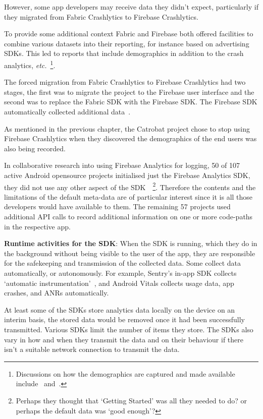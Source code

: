 However, some app developers may receive data they didn't expect, particularly if they migrated from Fabric Crashlytics to Firebase Crashlytics. 

To provide some additional context Fabric and Firebase both offered facilities to combine various datasets into their reporting, for instance based on advertising SDKs. This led to reports that include demographics in addition to the crash analytics, \emph{etc.}~\footnote{Discussions on how the demographics are captured and made available include~\citep{joe2016_firebase_analytics_demographics} and~\citep{chelo2020_firebase_does_not_collect_age_or_gender_data}.}. 

The forced migration from Fabric Crashlytics to Firebase Crashlytics had two stages, the first was to migrate the project to the Firebase user interface and the second was to replace the Fabric SDK with the Firebase SDK. The Firebase SDK automatically collected additional data~\citep{firebase_help_GA4_2021_predefined_user_dimensions}.

As mentioned in the previous chapter, the Catrobat project chose to stop using Firebase Crashlytics when they discovered the demographics of the end users was also being recorded. 
%

In collaborative research into using Firebase Analytics for logging, 50 of 107 active Android opensource projects initialised just the Firebase Analytics SDK, they did not use any other aspect of the SDK~\citep{harty2021_logging_practices_with_mobile_analytics}~\footnote{Perhaps they thought that `Getting Started' was all they needed to do? or perhaps the default data was `good enough'?}. Therefore the contents and the limitations of the default meta-data are of particular interest since it is all those developers would have available to them. The remaining 57 projects used additional API calls to record additional information on one or more code-paths in the respective app.

\textbf{Runtime activities for the SDK}: 
When the SDK is running, which they do in the background without being visible to the user of the app, they are responsible for the safekeeping and transmission of the collected data. Some collect data automatically, or autonomously. For example, Sentry's in-app SDK collects `automatic instrumentation'~\citep{sentry2021_mobile_vitals_four_metrics_every_mobile_developer_should_care_about}, and Android Vitals collects usage data, app crashes, and ANRs automatically.

At least some of the SDKs store analytics data locally on the device on an interim basis, the stored data would be removed once it had been successfully transmitted. Various SDKs limit the number of items they store. The SDKs also vary in how and when they transmit the data and on their behaviour if there isn't a suitable network connection to transmit the data.

